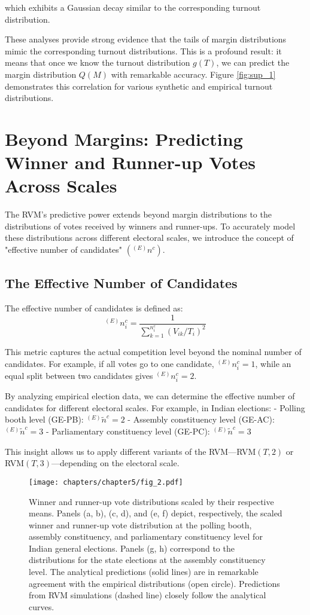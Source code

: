 which exhibits a Gaussian decay similar to the corresponding turnout distribution.

These analyses provide strong evidence that the tails of margin distributions mimic the corresponding turnout distributions. This is a profound result: it means that once we know the turnout distribution $g(T)$, we can predict the margin distribution $Q(M)$ with remarkable accuracy. Figure \ref{fig:sup_1} demonstrates this correlation for various synthetic and empirical turnout distributions.

\section{Beyond Margins: Predicting Winner and Runner-up Votes Across Scales}

The RVM's predictive power extends beyond margin distributions to the distributions of votes received by winners and runner-ups. To accurately model these distributions across different electoral scales, we introduce the concept of "effective number of candidates" $(^{(E)}n^c)$.

\subsection{The Effective Number of Candidates}

The effective number of candidates is defined as:
\begin{equation}
    ^{(E)}n^c_i = \frac{1}{\sum_{k=1}^{n^c_i} (V_{ik}/T_i)^2}
\end{equation}

This metric captures the actual competition level beyond the nominal number of candidates. For example, if all votes go to one candidate, $^{(E)}n^c_i = 1$, while an equal split between two candidates gives $^{(E)}n^c_i = 2$.

By analyzing empirical election data, we can determine the effective number of candidates for different electoral scales. For example, in Indian elections:
- Polling booth level (GE-PB): $^{(E)}\tilde{n}^c = 2$
- Assembly constituency level (GE-AC): $^{(E)}\tilde{n}^c = 3$
- Parliamentary constituency level (GE-PC): $^{(E)}\tilde{n}^c = 3$

This insight allows us to apply different variants of the RVM—RVM$(T,2)$ or RVM$(T,3)$—depending on the electoral scale.

\begin{figure}[h]
    \centering
    \texttt{[image: chapters/chapter5/fig\_2.pdf]}
    \caption{Winner and runner-up vote distributions scaled by their respective means. Panels (a, b), (c, d), and (e, f) depict, respectively, the scaled winner and runner-up vote distribution at the polling booth, assembly constituency, and parliamentary constituency level for Indian general elections. Panels (g, h) correspond to the distributions for the state elections at the assembly constituency level. The analytical predictions (solid lines) are in remarkable agreement with the empirical distributions (open circle). Predictions from RVM simulations (dashed line) closely follow the analytical curves.}
    \label{fig:2}
\end{figure}

